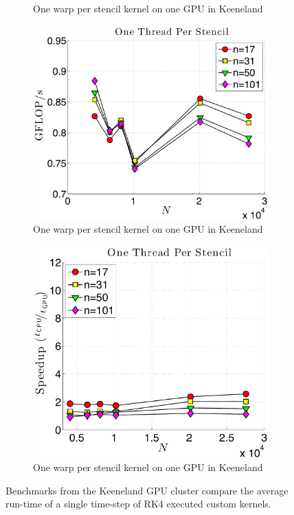 \begin{figure}
\begin{subfigure}[t]{0.425\textwidth}
\caption{One warp per stencil kernel on one GPU in Keeneland}
\label{fig:speedup_1proc_oneWarp_keeneland}
\end{subfigure} 
\begin{subfigure}[t]{0.425\textwidth}
\includegraphics[width=\textwidth]{../figures/keeneland_results/alltoallv_cosine/gflops_gpu_1proc_oneThreadPerStencil.pdf}
\caption{One warp per stencil kernel on one GPU in Keeneland}
\label{fig:gflops_gpu_1proc_oneThread_keeneland}
\end{subfigure}
\quad
\begin{subfigure}[t]{0.425\textwidth}
\includegraphics[width=\textwidth]{../figures/keeneland_results/alltoallv_cosine/speedup_1proc_oneThreadPerStencil.pdf}
\caption{One warp per stencil kernel on one GPU in Keeneland}
\label{fig:speedup_1proc_oneThread_keeneland}
\end{subfigure} 
\caption{Benchmarks from the Keeneland GPU cluster compare the average run-time of a single time-step of RK4 executed custom kernels.}
\end{figure} 

